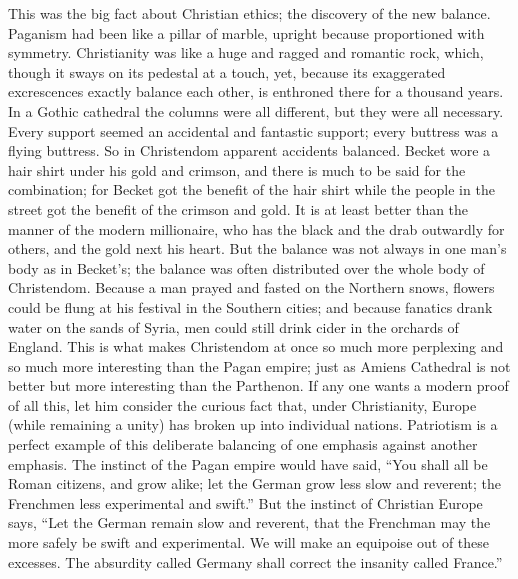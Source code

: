 This was the big fact about Christian ethics; the discovery of the new balance. Paganism had been like a pillar of marble, upright because proportioned with symmetry. Christianity was like a huge and ragged and romantic rock, which, though it sways on its pedestal at a touch, yet, because its exaggerated excrescences exactly balance each other, is enthroned there for a thousand years. In a Gothic cathedral the columns were all different, but they were all necessary. Every support seemed an accidental and fantastic support; every buttress was a flying buttress. So in Christendom apparent accidents balanced. Becket wore a hair shirt under his gold and crimson, and there is much to be said for the combination; for Becket got the benefit of the hair shirt while the people in the street got the benefit of the crimson and gold. It is at least better than the manner of the modern millionaire, who has the black and the drab outwardly for others, and the gold next his heart. But the balance was not always in one man’s body as in Becket’s; the balance was often distributed over the whole body of Christendom. Because a man prayed and fasted on the Northern snows, flowers could be flung at his festival in the Southern cities; and because fanatics drank water on the sands of Syria, men could still drink cider in the orchards of England. This is what makes Christendom at once so much more perplexing and so much more interesting than the Pagan empire; just as Amiens Cathedral is not better but more interesting than the Parthenon. If any one wants a modern proof of all this, let him consider the curious fact that, under Christianity, Europe (while remaining a unity) has broken up into individual nations. Patriotism is a perfect example of this deliberate balancing of one emphasis against another emphasis. The instinct of the Pagan empire would have said, “You shall all be Roman citizens, and grow alike; let the German grow less slow and reverent; the Frenchmen less experimental and swift.” But the instinct of Christian Europe says, “Let the German remain slow and reverent, that the Frenchman may the more safely be swift and experimental. We will make an equipoise out of these excesses. The absurdity called Germany shall correct the insanity called France.”

